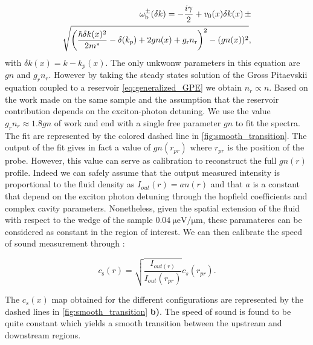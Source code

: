 \begin{equation}
    \label{eq:lfbogo}
    \begin{split}
        \omega_{\mathrm{b}}^{\pm}(\delta k)= -\frac{i\gamma}{2}+ v_0(x) \delta k(x)\,\pm \\\sqrt{\left(\frac{\hbar \delta k(x)^2}{2m^*}-\delta(k_p) +2gn(x) +g_\mathrm{r} n_\mathrm{r}    \right)^2-(gn(x))^2},
    \end{split}
\end{equation}
with $\delta k(x)=k-k_p(x)$. The only unkwonw parameters in this equation are $gn$ and $g_rn_r$. However by taking the steady states solution of the Gross Pitaevskii equation coupled to a reservoir \autoref{eq:generalized_GPE} we obtain $n_r\propto n$.
Based on the work \cite{claude_phd,claude_high-resolution_2022} made on the same sample and the assumption that the reservoir contribution depends on the exciton-photon detuning. We use the value $g_rn_r\approx 1.8gn$ of work \cite{claude_phd} and end 
with a single free parameter $gn$ to fit the spectra. The fit are represented by the colored dashed line in \autoref{fig:smooth_transition}. The output of the fit gives in fact a value of $gn(r_{pr})$ where $r_{pr}$ is the position of the probe. However, this value can serve 
as calibration to reconstruct the full $gn(r)$ profile. Indeed we can safely assume that the output measured intensity is proportional to the 
fluid density as $I_{out}(r)=a n(r)$ and that $a$ is a constant that depend on the exciton photon detuning through the hopfield coefficients and complex 
cavity parameters. Nonetheless, given the spatial extension of the fluid with respect to the wedge of the sample $\SI{0.04}{\micro \electronvolt \per \micro \meter}$, these paramateres can be considered as constant in the region of interest.
We can then calibrate the speed of sound measurement through :

\begin{equation}
    \label{eq:speed_of_sound_calib}
    c_\mathrm{s}(r)=\sqrt{\frac{I_{out(r)}}{I_{out}(r_{pr})}}c_s(r_{pr}).
\end{equation}

The $c_s(x)$ map obtained for the different configurations are represented by the dashed lines in \autoref{fig:smooth_transition} \textbf{b)}. The speed of sound is found to be quite constant which yields a smooth transition between the upstream and downstream regions. 

\bigskip

